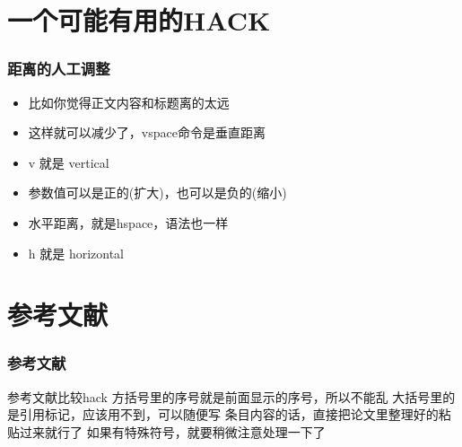 \documentclass[17pt]{beamer}
\begin{document}
    \section{一个可能有用的HACK}
    
    \begin{frame}
        \frametitle{距离的人工调整}
        \vspace{-6cm} %
        \begin{itemize}
            \item 比如你觉得正文内容和标题离的太远
            \item 这样就可以减少了，vspace命令是垂直距离
            \item v 就是 vertical
            \item 参数值可以是正的(扩大)，也可以是负的(缩小)
            \item 水平距离，就是hspace，语法也一样
            \item h 就是 horizontal
        \end{itemize}
    \end{frame}
    
    \section{参考文献}
    
    \begin{frame}
        \frametitle{参考文献}
        \vspace{-1.5cm}
        \begin{thebibliography}{}
             参考文献比较hack
             方括号里的序号就是前面显示的序号，所以不能乱
             大括号里的是引用标记，应该用不到，可以随便写
             条目内容的话，直接把论文里整理好的粘贴过来就行了
             如果有特殊符号，就要稍微注意处理一下了
        \end{thebibliography}
    \end{frame}

\end{document}
